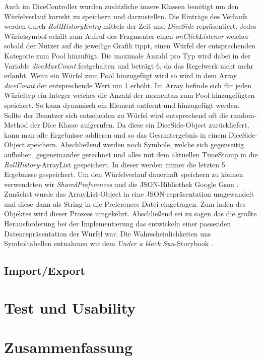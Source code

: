 Auch im DiceController wurden zusätzliche innere Klassen benötigt um den Würfelverlauf korrekt zu speichern und darzustellen. Die Einträge des Verlaufs werden durch \textit{RollHistoryEntry} mittels der Zeit und \textit{DiceSide} repräsentiert. Jedes Würfelsymbol erhält zum Aufruf des Fragmentes einen \textit{onClickListener} welcher sobald der Nutzer auf die jeweilige Grafik tippt, einen Würfel der entsprechenden Kategorie zum \grqq Pool\grqq{} hinzufügt. Die maximale Anzahl pro Typ wird dabei in der Variable \textit{diceMaxCount} festgehalten und beträgt 6, da das Regelwerk nicht mehr erlaubt. Wenn ein Würfel zum Pool hinzugefügt wird so wird in dem Array \textit{diceCount} der entsprechende Wert um 1 erhöht. Im Array befinde sich für jeden Würfeltyp ein Integer welches die Anzahl der momentan zum Pool hinzugefügten speichert. So kann dynamisch ein Element entfernt und hinzugefügt werden. Sollte der Benutzer sich entscheiden zu Würfel wird entsprechend oft die random-Method der Dice Klasse aufgerufen. Da diese ein DiceSide-Object zurückliefert, kann man alle Ergebnisse addieren und so das Gesamtergebnis in einem DiceSide-Object speichern. Abschließend werden noch Symbole, welche sich gegenseitig aufheben, gegeneinander gerechnet und alles mit dem aktuellen TimeStamp in die \textit{RollHistory}-ArrayList gespeichert. In dieser werden immer die letzten 5 Ergebnisse gespeichert. Um den Würfelverlauf dauerhaft speichern zu können verwendeten wir \textit{SharedPreferences} und die JSON-Bibliothek Google Gson \cite{gson}. Zunächst wurde das ArrayList-Object in eine JSON-repräsentation umgewandelt und diese dann als String in die Preferences Datei eingetragen. Zum laden des Objektes wird dieser Prozess umgekehrt. Abschließend sei zu sagen das die größte Herausforderung bei der Implementierung das entwickeln einer passenden Datenrepräsentation der Würfel war. Die Wahrscheinlichkeiten uns Symboltabellen entnahmen wir dem \textit{Under a black Sun}-Storybook \cite{adventurebook}.

\subsection{Import/Export}
\section{Test und Usability}

\section{Zusammenfassung}